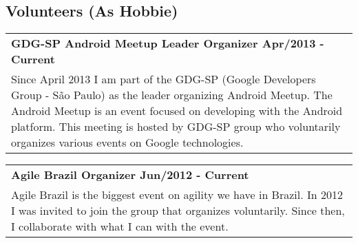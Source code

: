 \documentclass[a4paper, oneside, final]{scrartcl}
\newcommand{\vspc}{\vspace{0.15cm}} %
\begin{document}
\begin{center}
\section{Volunteers (As Hobbie)}
\begin{tabularx}{1\linewidth}{X}
{\bf GDG-SP Android Meetup Leader Organizer \hfill Apr/2013 - Current} \\
Since April 2013 I am part of the GDG-SP (Google Developers Group - São Paulo) as the leader organizing Android Meetup. The Android Meetup is an event focused on developing with the Android platform. This meeting is hosted by GDG-SP group who voluntarily organizes various events on Google technologies. \vspc\\
\end{tabularx}

\begin{tabularx}{1\linewidth}{X}
{\bf Agile Brazil Organizer \hfill Jun/2012 - Current} \\
Agile Brazil is the biggest event on agility we have in Brazil. In 2012 I was invited to join the group that organizes voluntarily. Since then, I collaborate with what I can with the event. \vspc\\
\end{tabularx}


\end{center}
\end{document}
